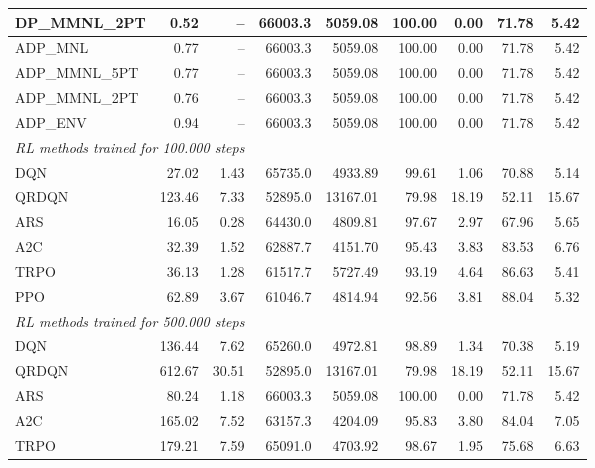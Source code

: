 \begin{samepage}
\begin{center}
\begin{tabular}{l|rr|rr|rr|rr}
    DP\_MMNL\_2PT &     0.52 &    -- &    66003.3 &    5059.08 &  100.00 &    0.00 &   71.78 &    5.42 \\
    \midrule
    ADP\_MNL     &     0.77 &    -- &    66003.3 &    5059.08 &  100.00 &    0.00 &   71.78 &    5.42 \\
    ADP\_MMNL\_5PT &     0.77 &    -- &    66003.3 &    5059.08 &  100.00 &    0.00 &   71.78 &    5.42 \\
    ADP\_MMNL\_2PT &     0.76 &    -- &    66003.3 &    5059.08 &  100.00 &    0.00 &   71.78 &    5.42 \\
    ADP\_ENV     &     0.94 &    -- &    66003.3 &    5059.08 &  100.00 &    0.00 &   71.78 &    5.42 \\
    \midrule
    \multicolumn{9}{l}{\textit{RL methods trained for 100.000 steps}} \\
    \midrule
    DQN          &    27.02 &     1.43 &    65735.0 &    4933.89 &   99.61 &    1.06 &   70.88 &    5.14 \\
    QRDQN        &   123.46 &     7.33 &    52895.0 &   13167.01 &   79.98 &   18.19 &   52.11 &   15.67 \\
    ARS          &    16.05 &     0.28 &    64430.0 &    4809.81 &   97.67 &    2.97 &   67.96 &    5.65 \\
    A2C          &    32.39 &     1.52 &    62887.7 &    4151.70 &   95.43 &    3.83 &   83.53 &    6.76 \\
    TRPO         &    36.13 &     1.28 &    61517.7 &    5727.49 &   93.19 &    4.64 &   86.63 &    5.41 \\
    PPO          &    62.89 &     3.67 &    61046.7 &    4814.94 &   92.56 &    3.81 &   88.04 &    5.32 \\
    \midrule
    \multicolumn{9}{l}{\textit{RL methods trained for 500.000 steps}} \\
    \midrule
    DQN          &   136.44 &     7.62 &    65260.0 &    4972.81 &   98.89 &    1.34 &   70.38 &    5.19 \\
    QRDQN        &   612.67 &    30.51 &    52895.0 &   13167.01 &   79.98 &   18.19 &   52.11 &   15.67 \\
    ARS          &    80.24 &     1.18 &    66003.3 &    5059.08 &  100.00 &    0.00 &   71.78 &    5.42 \\
    A2C          &   165.02 &     7.52 &    63157.3 &    4204.09 &   95.83 &    3.80 &   84.04 &    7.05 \\
    TRPO         &   179.21 &     7.59 &    65091.0 &    4703.92 &   98.67 &    1.95 &   75.68 &    6.63 \\

\end{tabular}
\end{center}
\end{samepage}

